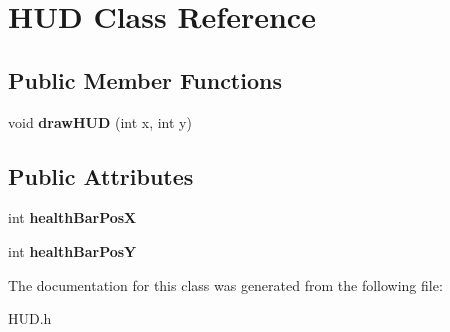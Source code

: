 \hypertarget{class_h_u_d}{}\section{H\+UD Class Reference}
\label{class_h_u_d}
\subsection*{Public Member Functions}
\begin{DoxyCompactItemize}
\item 
\mbox{\label{class_h_u_d_a5f3f7d3fde8133a38501c9db935da955}} 
void {\bfseries draw\+H\+UD} (int x, int y)
\end{DoxyCompactItemize}
\subsection*{Public Attributes}
\begin{DoxyCompactItemize}
\item 
\mbox{\label{class_h_u_d_a1061ae317ebe12a5a3cef7500670fae1}} 
int {\bfseries health\+Bar\+PosX}
\item 
\mbox{\label{class_h_u_d_a8bc4987d1daffd2286a483fb77c033ee}} 
int {\bfseries health\+Bar\+PosY}
\end{DoxyCompactItemize}


The documentation for this class was generated from the following file\+:\begin{DoxyCompactItemize}
\item 
H\+U\+D.\+h\end{DoxyCompactItemize}
